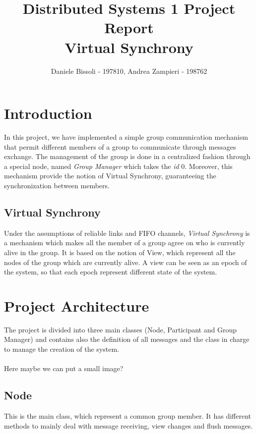 \documentclass[11pt]{article}
\title{\LARGE{\textbf{Distributed Systems 1 Project Report\\\small{Virtual Synchrony}}}}
\author{Daniele Bissoli - 197810, Andrea Zampieri - 198762}
\date{}
\begin{document}
	\maketitle
	
	\section{Introduction}
	In this project, we have implemented a simple group communication mechanism that permit different members of a group to communicate through messages exchange. The management of the group is done in a centralized fashion through a special node, named \textit{Group Manager} which takes the \textit{id} 0. Moreover, this mechanism provide the notion of Virtual Synchrony, guaranteeing the synchronization between members.
	
	\subsection{Virtual Synchrony}
	Under the assumptions of reliable links and FIFO channels, \textit{Virtual Synchrony} is a mechanism which makes all the member of a group agree on who is currently alive in the group. It is based on the notion of View, which represent all the nodes of the group which are currently alive. A view can be seen as an epoch of the system, so that each epoch represent different state of the system.
	
	\section{Project Architecture}
	The project is divided into three main classes (Node, Participant and Group Manager) and contains also the definition of all messages and the class in charge to manage the creation of the system.
	\\\\
	Here maybe we can put a small image?
	
	\subsection{Node}
	This is the main class, which represent a common group member. It has different methods to mainly deal with message receiving, view changes and flush messages.
	
\end{document}

